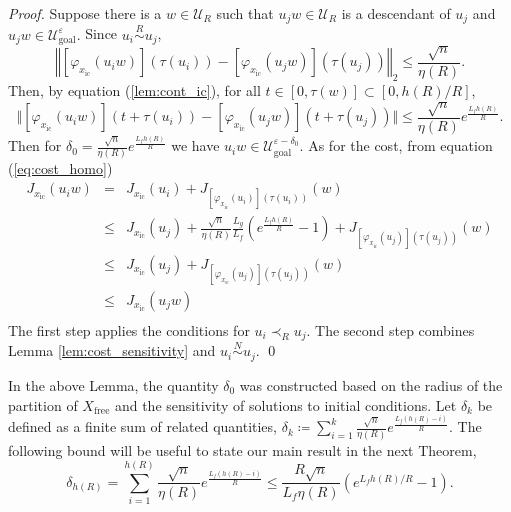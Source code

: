 \documentclass{llncs}
\begin{document}
\begin{proof}
Suppose there is a $w\in\mathcal{U}_{R}$ such that $u_{j}w\in\mathcal{U}_{R}$
is a descendant of $u_{j}$ and $u_{j}w\in\mathcal{U}_\mathrm{goal}^{\varepsilon}.$
 Since $u_{i}\overset{R}{\sim}u_{j}$,
\begin{equation}
\left\Vert[\varphi_{x_\mathrm{ic}}(u_{i}w)](\tau(u_{i}))-[\varphi_{x_\mathrm{ic}}(u_{j}w)](\tau(u_{j}))\right\Vert_2\leq \frac{\sqrt{n}}{\eta(R)}.
\end{equation}
Then, by equation (\ref{lem:cont_ic}), for all $t\in[0,\tau(w)]\subset[0,h(R)/R]$, 
\begin{equation}
\Vert[\varphi_{x_\mathrm{ic}}(u_{i}w)](t+\tau(u_{i}))-[\varphi_{x_\mathrm{ic}}(u_{j}w)](t+\tau(u_{j}))\Vert\leq\frac{\sqrt{n}}{\eta(R)}e^{\frac{L_{f}h(R)}{R}}.\label{eq:-8}
\end{equation}
Then for $\delta_0=\frac{\sqrt{n}}{\eta(R)}e^{\frac{L_{f}h(R)}{R}}$
we have $u_{i} w \in \mathcal{U}_\mathrm{goal}^{\varepsilon-\delta_0}.$ 
As for the cost, from equation (\ref{eq:cost_homo}) 
\begin{equation}
\begin{array}{rcl}
J_{x_\mathrm{ic}}(u_{i} w) & = & J_{x_\mathrm{ic}}(u_{i})+J_{[\varphi_{x_\mathrm{ic}}(u_{i})](\tau(u_{i}))}(w)\\
 & \leq & J_{x_\mathrm{ic}}(u_{j})+\frac{\sqrt{n}}{\eta(R)}\frac{L_{g}}{L_{f}}\left(e^{\frac{L_{f}h(R)}{R}}-1\right) +J_{[\varphi_{x_\mathrm{ic}}(u_{j})](\tau(u_{j}))}(w)\\
 & \leq & J_{x_\mathrm{ic}}(u_{j})+J_{[\varphi_{x_\mathrm{ic}}(u_{j})](\tau(u_{j}))}(w)\\
 & \leq  & J_{x_\mathrm{ic}}(u_{j}w)\\
\end{array}
\end{equation}
 The first step applies the conditions for $u_{i}\prec_{R}u_{j}$.
The second step combines Lemma \ref{lem:cost_sensitivity} and $u_{i}\overset{N}{\sim}u_{j}$. 
\qed
\end{proof}
In the above Lemma, the quantity $\delta_0$ was constructed based on the radius of the partition of $X_\mathrm{free}$ and the sensitivity of solutions to initial conditions. 
%
%
Let $\delta_k$ be defined as a finite sum of related quantities, $\delta_k\coloneqq\sum_{i=1}^{k}\frac{\sqrt{n}}{\eta(R)}e^{\frac{L_{f}(h(R)-i)}{R}}$. The following bound will be useful to state our main result in the next Theorem,
\begin{equation}
\delta_{h(R)}=\sum_{i=1}^{h(R)}\frac{\sqrt{n}}{\eta(R)}e^{\frac{L_{f}(h(R)-i)}{R}} \leq\frac{R\sqrt{n}}{L_{f}\eta(R)}\left(e^{L_{f}h(R)/R}-1\right).\label{eq:inequality}
\end{equation}
\end{document}

